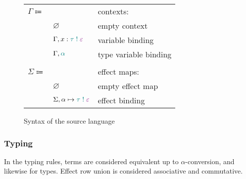 \documentclass[12pt]{article}
\newcommand\anno[2]{#1 : \colorType{#2}}
\newcommand\eVar{x}
\newcommand\colorType[1]{\textcolor{teal}{#1}}
\newcommand\type{\tau}
\newcommand\tVar{\alpha}
\newcommand\tEmbellished[2]{#1 \; ! \; \colorRow{#2}}
\newcommand\colorRow[1]{\textcolor{violet}{#1}}
\newcommand\row{\varepsilon}
\newcommand\context{\Gamma}
\newcommand\cEmpty{\varnothing}
\newcommand\cTExtend[4]{#1, \anno{#2}{\tEmbellished{#3}{#4}}}
\newcommand\cKExtend[2]{#1, \colorType{#2}}
\newcommand\effectMap{\Sigma}
\newcommand\emEmpty{\varnothing}
\newcommand\emExtend[4]{#1, #2 \mapsto \colorType{\tEmbellished{#3}{#4}}}
\begin{document}
\begin{figure}[H]
\begin{mdframed}[backgroundcolor=none]
\begin{center}
\begin{tabular}{l l l}
                \\
                $\context \Coloneqq$ & & contexts: \\
                & $\cEmpty$ & empty context \\
                & $\cTExtend{\context}{\eVar}{\type}{\row}$ & variable binding \\
                & $\cKExtend{\context}{\tVar}$ & type variable binding \\
                \\
                $\effectMap \Coloneqq$ & & effect maps: \\
                & $\emEmpty$ & empty effect map \\
                & $\emExtend{\effectMap}{\tVar}{\type}{\row}$ & effect binding \\
              \end{tabular}
            \end{center}

            \caption{Syntax of the source language}\label{fig:source_syntax}
          \end{mdframed}
        \end{figure}

      \subsubsection{Typing}
        In the typing rules, terms are considered equivalent up to $\alpha$-conversion, and likewise for types. Effect row union is considered associative and commutative.
\end{document}
